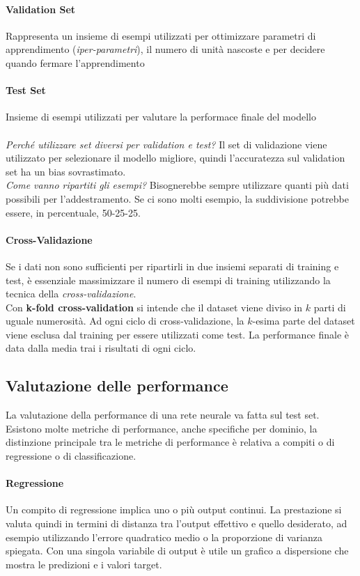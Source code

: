 \documentclass[12pt, a4paper]{article}
\begin{document}
\paragraph{Validation Set}
Rappresenta un insieme di esempi utilizzati per ottimizzare parametri di apprendimento (\textit{iper-parametri}), il numero di unità nascoste e per decidere quando fermare l'apprendimento

\paragraph{Test Set}
Insieme di esempi utilizzati per valutare la performace finale del modello\\
\\
\textit{Perché utilizzare set diversi per validation e test?} Il set di validazione viene utilizzato per selezionare il modello migliore, quindi l'accuratezza sul validation set ha un bias sovrastimato.\\
\textit{Come vanno ripartiti gli esempi?} Bisognerebbe sempre utilizzare quanti più dati possibili per l'addestramento. Se ci sono molti esempio, la suddivisione potrebbe essere, in percentuale, 50-25-25.

\paragraph{Cross-Validazione}
Se i dati non sono sufficienti per ripartirli in due insiemi separati di training e test, è essenziale massimizzare il numero di esempi di training utilizzando la tecnica della \textit{cross-validazione}.\\
Con \textbf{k-fold cross-validation} si intende che il dataset viene diviso in \(k\) parti di uguale numerosità. Ad ogni ciclo di cross-validazione, la \(k\)-esima parte del dataset viene esclusa dal training per essere utilizzati come test. La performance finale è data dalla media trai i risultati di ogni ciclo.

\subsection{Valutazione delle performance}
La valutazione della performance di una rete neurale va fatta sul test set. Esistono molte metriche di performance, anche specifiche per dominio, la distinzione principale tra le metriche di performance è relativa a compiti o di regressione o di classificazione.\\
\paragraph{Regressione} Un compito di regressione implica uno o più output continui. La prestazione si valuta quindi in termini di distanza tra l'output effettivo e quello desiderato, ad esempio utilizzando l'errore quadratico medio o la proporzione di varianza spiegata. Con una singola variabile di output è utile un grafico a dispersione che mostra le predizioni e i valori target.
\end{document}
